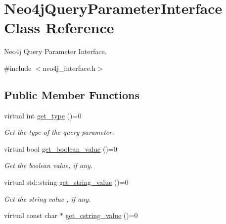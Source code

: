 \hypertarget{classNeo4jQueryParameterInterface}{}\section{Neo4j\+Query\+Parameter\+Interface Class Reference}
\label{classNeo4jQueryParameterInterface}


Neo4j Query Parameter Interface.  




{\ttfamily \#include $<$neo4j\+\_\+interface.\+h$>$}

\subsection*{Public Member Functions}
\begin{DoxyCompactItemize}
\item 
virtual int \hyperlink{classNeo4jQueryParameterInterface_a8c5aeb2e298552ae5d643f54fda6b067}{get\+\_\+type} ()=0\hypertarget{classNeo4jQueryParameterInterface_a8c5aeb2e298552ae5d643f54fda6b067}{}\label{classNeo4jQueryParameterInterface_a8c5aeb2e298552ae5d643f54fda6b067}

\begin{DoxyCompactList}\small\item\em Get the type of the query parameter. \end{DoxyCompactList}\item 
virtual bool \hyperlink{classNeo4jQueryParameterInterface_ab74d0dad94e41520a821b4f0577b93fd}{get\+\_\+boolean\+\_\+value} ()=0\hypertarget{classNeo4jQueryParameterInterface_ab74d0dad94e41520a821b4f0577b93fd}{}\label{classNeo4jQueryParameterInterface_ab74d0dad94e41520a821b4f0577b93fd}

\begin{DoxyCompactList}\small\item\em Get the boolean value, if any. \end{DoxyCompactList}\item 
virtual std\+::string \hyperlink{classNeo4jQueryParameterInterface_ac45d7e2c99c35161d4528e7b9d20b76b}{get\+\_\+string\+\_\+value} ()=0\hypertarget{classNeo4jQueryParameterInterface_ac45d7e2c99c35161d4528e7b9d20b76b}{}\label{classNeo4jQueryParameterInterface_ac45d7e2c99c35161d4528e7b9d20b76b}

\begin{DoxyCompactList}\small\item\em Get the string value , if any. \end{DoxyCompactList}\item 
virtual const char $\ast$ \hyperlink{classNeo4jQueryParameterInterface_ad7c2a0ebfaeebbdbfb4169e10ee0d6fe}{get\+\_\+cstring\+\_\+value} ()=0\hypertarget{classNeo4jQueryParameterInterface_ad7c2a0ebfaeebbdbfb4169e10ee0d6fe}{}\label{classNeo4jQueryParameterInterface_ad7c2a0ebfaeebbdbfb4169e10ee0d6fe}


\end{DoxyCompactItemize}
